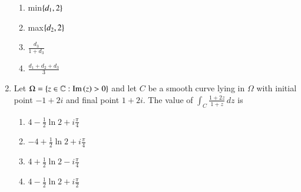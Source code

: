 \documentclass[journal]{IEEEtran}
\begin{document}
\begin{enumerate}
\begin{enumerate}
    \item min$\left\{d_1,2\right\}$
    \item max$\left\{d_2,2\right\}$
    \item $\frac{d_3}{1+d_3}$
    \item $\frac{d_1+d_2+d_3}{3}$
\end{enumerate}
\item Let $\Omega = \left\{ z \in \mathbb{C} : \text{Im}\left(z\right) > 0 \right\}$ and let $C$ be a smooth curve lying in $\Omega$ with initial point $-1 + 2i$ and final point $1 + 2i$. The value of $\int_C \frac{1 + 2z}{1 + z} \, dz$ is
\begin{enumerate}
    \item $4 - \frac{1}{2} \ln 2 + i \frac{\pi}{4}$
    \item $-4 + \frac{1}{2} \ln 2 + i \frac{\pi}{4}$
    \item $4 + \frac{1}{2} \ln 2 - i \frac{\pi}{4}$
    \item $4 - \frac{1}{2} \ln 2 + i \frac{\pi}{2}$
\end{enumerate}
\end{enumerate}

\end{document}
